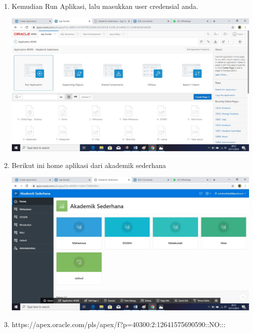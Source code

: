 \documentclass[a4paper,12pt]{report}
\begin{document}
\begin{enumerate}
\begin{center}
    \end{center}
    \item Kemudian Run Aplikasi, lalu masukkan user credensial anda.
    \begin{center}
    \includegraphics[width=11cm\textwidth]{figure/18.jpg}
    \end{center}
    \item Berikut ini home aplikasi dari akademik sederhana
    \begin{center}
    \includegraphics[width=11cm\textwidth]{figure/19.jpg}
    \end{center}
    \item https://apex.oracle.com/pls/apex/f?p=40300:2:12641575690590::NO:::
\end{enumerate}
\end{document}
